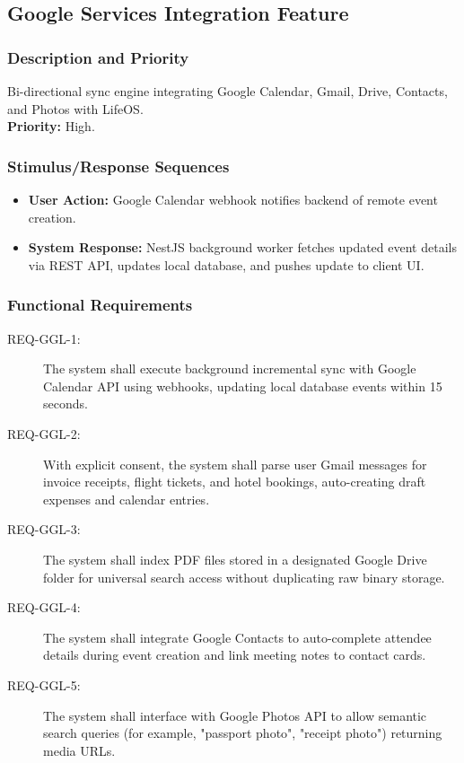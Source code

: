 \documentclass[11pt,a4paper]{article}
\begin{document}
\subsection{Google Services Integration Feature}
\subsubsection{Description and Priority}
Bi-directional sync engine integrating Google Calendar, Gmail, Drive, Contacts, and Photos with LifeOS. \\
\textbf{Priority:} High.

\subsubsection{Stimulus/Response Sequences}
\begin{itemize}
    \item \textbf{User Action:} Google Calendar webhook notifies backend of remote event creation.
    \item \textbf{System Response:} NestJS background worker fetches updated event details via REST API, updates local database, and pushes update to client UI.
\end{itemize}

\subsubsection{Functional Requirements}
\begin{description}
    \item[REQ-GGL-1:] The system shall execute background incremental sync with Google Calendar API using webhooks, updating local database events within 15 seconds.
    \item[REQ-GGL-2:] With explicit consent, the system shall parse user Gmail messages for invoice receipts, flight tickets, and hotel bookings, auto-creating draft expenses and calendar entries.
    \item[REQ-GGL-3:] The system shall index PDF files stored in a designated Google Drive folder for universal search access without duplicating raw binary storage.
    \item[REQ-GGL-4:] The system shall integrate Google Contacts to auto-complete attendee details during event creation and link meeting notes to contact cards.
    \item[REQ-GGL-5:] The system shall interface with Google Photos API to allow semantic search queries (for example, "passport photo", "receipt photo") returning media URLs.
\end{description}
\end{document}
